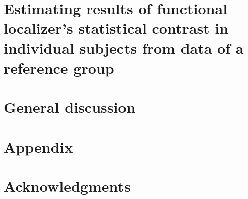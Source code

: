\documentclass[english,12pt]{report}
\begin{document}
\begin{spacing}{1.5}
\chapter{Estimating results of functional localizer's statistical contrast in
individual subjects from data of a reference group}






\chapter{General discussion}






% 







\chapter{Appendix}





\chapter*{Acknowledgments}










\end{spacing}
\end{document}
